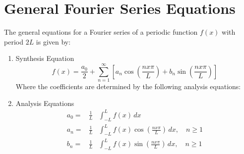 \documentclass{article}
\begin{document}
\section{General Fourier Series Equations}

The general equations for a Fourier series of a periodic function $f(x)$ with period $2L$ is given by:

\begin{enumerate}
    \item Synthesis Equation
    \begin{equation}
    f(x) = \frac{a_0}{2} + \sum_{n=1}^{\infty} \left[ a_n \cos\left(\frac{nx\pi}{L}\right) + b_n \sin\left(\frac{nx\pi}{L}\right) \right] 
    \end{equation}
Where the coefficients are determined by the following analysis equations:

    \item Analysis Equations
    \begin{eqnarray}
    a_0 =& \frac{1}{L}& \int_{-L}^{L} f(x) \, dx
    \nonumber\\
a_n =& \frac{1}{L}& \int_{-L}^{L} f(x) \cos\left(\frac{nx\pi}{L}\right) \, dx, \quad n \geq 1\label{eqn:Analysis Equations}\\
b_n =& \frac{1}{L}& \int_{-L}^{L} f(x) \sin\left(\frac{nx\pi}{L}\right) \, dx, \quad n \geq 1
\nonumber
    \end{eqnarray}
\end{enumerate}
\end{document}
